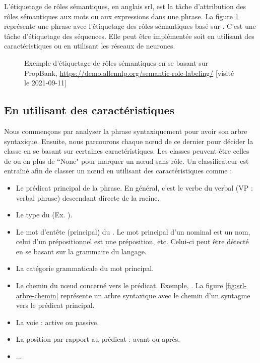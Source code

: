 \documentclass{KodeBook}
\begin{document}
L'étiquetage de rôles sémantiques, en anglais \ac{srl}, est la tâche d'attribution des rôles sémantiques aux mots ou aux expressions dans une phrase.
La figure \ref{fig:srl-exp} représente une phrase avec l'étiquetage des rôles sémantiques basé sur .
C'est une tâche d'étiquetage des séquences. 
Elle peut être implémentée soit en utilisant des caractéristiques ou en utilisant les réseaux de neurones.

\begin{figure}[ht]
	\centering
	\caption[Exemple d'étiquetage de rôles sémantiques en se basant sur PropBank]{Exemple d'étiquetage de rôles sémantiques en se basant sur PropBank, \url{https://demo.allennlp.org/semantic-role-labeling/} [visité le 2021-09-11]}
	\label{fig:srl-exp}
\end{figure}

\subsection{En utilisant des caractéristiques}

Nous commençons par analyser la phrase syntaxiquement pour avoir son arbre syntaxique. 
Ensuite, nous parcourons chaque nœud de ce dernier pour décider la classe en se basant sur certaines caractéristiques. 
Les classes peuvent être celles de  ou  en plus de ``None" pour marquer un nœud sans rôle.
Un classificateur est entraîné afin de classer un nœud en utilisant des caractéristiques comme :
\begin{itemize}
	\item Le prédicat principal de la phrase. En général, c'est le verbe du  verbal (VP : verbal phrase) descendant directe de la racine.
	\item Le type du  (Ex. ).
	\item Le mot d'entête (principal) du . 
	Le mot principal d'un  nominal est un nom, celui d'un  prépositionnel est une préposition, etc. 
	Celui-ci peut être détecté en se basant sur la grammaire du langage.
	\item La catégorie grammaticale du mot principal.
	\item Le chemin du nœud concerné vers le prédicat. 
	Exemple, .
	La figure \ref{fig:srl-arbre-chemin} représente un arbre syntaxique avec le chemin d'un syntagme vers le prédicat principal.
	\item La voie : active ou passive.
	\item La position par rapport au prédicat : avant ou après.
	\item ...
\end{itemize}
\end{document}
